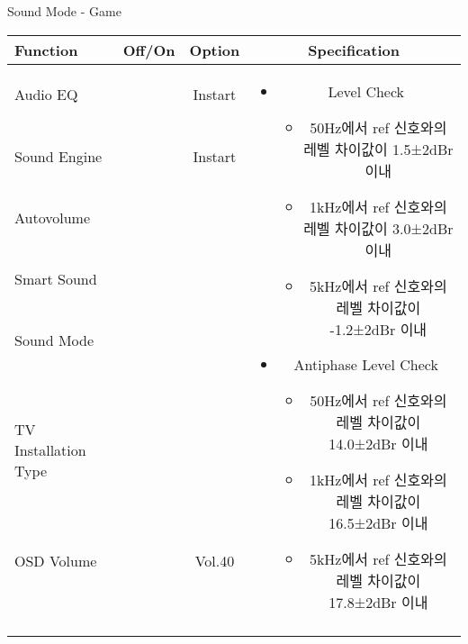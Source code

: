 \begin{frame}[t]{Sound Mode - Game}
\begin{tiny}
\begin{tabular}{@{}lccc@{}}
\toprule
Function & Off/On & Option & Specification \\
\midrule
Audio EQ & \color{black}{Off} & Instart &
\multirow{10}{60mm}{
\begin{itemize}
    \item Level Check
    \begin{itemize}
        \item 50Hz에서 ref 신호와의 레벨 차이값이 1.5±2dBr 이내
        \item 1kHz에서 ref 신호와의 레벨 차이값이 3.0±2dBr 이내
        \item 5kHz에서 ref 신호와의 레벨 차이값이 -1.2±2dBr 이내
    \end{itemize}
    \item Antiphase Level Check
    \begin{itemize}
        \item 50Hz에서 ref 신호와의 레벨 차이값이 14.0±2dBr 이내
        \item 1kHz에서 ref 신호와의 레벨 차이값이 16.5±2dBr 이내
        \item 5kHz에서 ref 신호와의 레벨 차이값이 17.8±2dBr 이내
    \end{itemize}
\end{itemize}
} \\
Sound Engine & \color{blue}{On} & Instart & \\
Autovolume & \color{black}{Off} & & \\
Smart Sound & \color{black}{Off} & & \\
Sound Mode & \color{blue}{On} & \color{blue}{Game} & \\
TV Installation Type & \color{blue}{On} & \color{black}{Standtype1} & \\
OSD Volume & \color{blue}{On} & Vol.40 & \\
& & & \\
& & & \\
& & & \\
& & & \\
\midrule
\end{tabular}
\end{tiny}

\end{frame}
